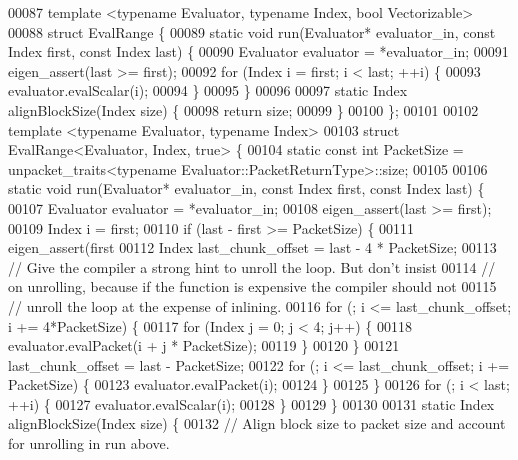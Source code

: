 \begin{DoxyCode}
00087 \textcolor{keyword}{template} <\textcolor{keyword}{typename} Evaluator, \textcolor{keyword}{typename} Index, \textcolor{keywordtype}{bool} Vectorizable>
00088 \textcolor{keyword}{struct }EvalRange \{
00089   \textcolor{keyword}{static} \textcolor{keywordtype}{void} run(Evaluator* evaluator\_in, \textcolor{keyword}{const} Index first, \textcolor{keyword}{const} Index last) \{
00090     Evaluator evaluator = *evaluator\_in;
00091     eigen\_assert(last >= first);
00092     \textcolor{keywordflow}{for} (Index i = first; i < last; ++i) \{
00093       evaluator.evalScalar(i);
00094     \}
00095   \}
00096 
00097   \textcolor{keyword}{static} Index alignBlockSize(Index size) \{
00098     \textcolor{keywordflow}{return} size;
00099   \}
00100 \};
00101 
00102 \textcolor{keyword}{template} <\textcolor{keyword}{typename} Evaluator, \textcolor{keyword}{typename} Index>
00103 \textcolor{keyword}{struct }EvalRange<Evaluator, Index, true> \{
00104   \textcolor{keyword}{static} \textcolor{keyword}{const} \textcolor{keywordtype}{int} PacketSize = unpacket\_traits<typename Evaluator::PacketReturnType>::size;
00105 
00106   \textcolor{keyword}{static} \textcolor{keywordtype}{void} run(Evaluator* evaluator\_in, \textcolor{keyword}{const} Index first, \textcolor{keyword}{const} Index last) \{
00107     Evaluator evaluator = *evaluator\_in;
00108     eigen\_assert(last >= first);
00109     Index i = first;
00110     \textcolor{keywordflow}{if} (last - first >= PacketSize) \{
00111       eigen\_assert(first %
00112       Index last\_chunk\_offset = last - 4 * PacketSize;
00113       \textcolor{comment}{// Give the compiler a strong hint to unroll the loop. But don't insist}
00114       \textcolor{comment}{// on unrolling, because if the function is expensive the compiler should not}
00115       \textcolor{comment}{// unroll the loop at the expense of inlining.}
00116       \textcolor{keywordflow}{for} (; i <= last\_chunk\_offset; i += 4*PacketSize) \{
00117         \textcolor{keywordflow}{for} (Index j = 0; j < 4; j++) \{
00118           evaluator.evalPacket(i + j * PacketSize);
00119         \}
00120       \}
00121       last\_chunk\_offset = last - PacketSize;
00122       \textcolor{keywordflow}{for} (; i <= last\_chunk\_offset; i += PacketSize) \{
00123         evaluator.evalPacket(i);
00124       \}
00125     \}
00126     \textcolor{keywordflow}{for} (; i < last; ++i) \{
00127       evaluator.evalScalar(i);
00128     \}
00129   \}
00130 
00131   \textcolor{keyword}{static} Index alignBlockSize(Index size) \{
00132     \textcolor{comment}{// Align block size to packet size and account for unrolling in run above.}

\end{DoxyCode}
